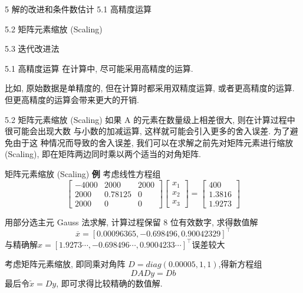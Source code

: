 \documentclass[notheorems,serif]{beamer}
\begin{document}
\begin{frame}{5 \quad 解的改进和条件数估计}
5.1 \qquad 高精度运算

5.2 \qquad 矩阵元素缩放 (Scaling)

5.3 \qquad 迭代改进法
\end{frame}

\begin{frame}{5.1 \quad 高精度运算}
在计算中, 尽可能采用高精度的运算.

比如, 原始数据是单精度的, 但在计算时都采用双精度运算, 或者更高精度的运算. 但更高精度的运算会带来更大的开销.
\end{frame}

\begin{frame}{5.2 \quad 矩阵元素缩放 (Scaling)}
如果 A 的元素在数量级上相差很大, 则在计算过程中很可能会出现大数
与小数的加减运算, 这样就可能会引入更多的舍入误差. 为了避免由于这
种情况而导致的舍入误差, 我们可以在求解之前先对矩阵元素进行缩放
(Scaling), 即在矩阵两边同时乘以两个适当的对角矩阵.
\end{frame}

\begin{frame}{矩阵元素缩放 (Scaling)}
{\bfseries 例} 考虑线性方程组
\begin{equation}
\left[\begin{array}{ccc}{-4000} & {2000} & {2000} \\ {2000} & {0.78125} & {0} \\ {2000} & {0} & {0}\end{array}\right]\left[\begin{array}{l}{x_{1}} \\ {x_{2}} \\ {x_{3}}\end{array}\right]=\left[\begin{array}{c}{400} \\ {1.3816} \\ {1.9273}\end{array}\right]
\end{equation}

用部分选主元 Gauss 法求解, 计算过程保留 8 位有效数字, 求得数值解
\begin{equation}
\overline{x}=[0.00096365,-0.698496,0.90042329]^{\top}
\end{equation}
与精确解$x=[1.9273 \cdots,-0.698496 \cdots, 0.9004233 \cdots]^{\top}$误差较大

考虑矩阵元素缩放, 即同乘对角阵  $D = diag(0.00005, 1, 1)$,得新方程组
\begin{equation}
D A D y=D b
\end{equation}
最后令$\tilde{x}=D y$, 即可求得比较精确的数值解.
\end{frame}
\end{document}
